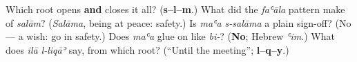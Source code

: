 \begin{tcolorbox}[breakable,colback=teal!4,colframe=teal!35!black,title={Before you move on}]
Which root opens \textbf{and} closes it all? (\textbf{s–l–m}.) What did the \emph{faʿāla} pattern make of \emph{salām}? (\emph{Salāma}, being at peace: safety.) Is \emph{maʿa s-salāma} a plain sign-off? (No — a wish: go in safety.) Does \emph{maʿa} glue on like \emph{bi-}? (\textbf{No}; Hebrew \emph{ʿim}.) What does \emph{ilā l-liqāʾ} say, from which root? (\textquotedblleft{}Until the meeting\textquotedblright{}; \textbf{l–q–y}.)
\end{tcolorbox}
